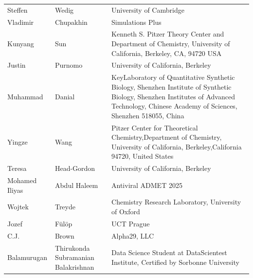 \documentclass{article}
\begin{document}
\begin{table}[]
\begin{tabular}{lll}
\rowcolor[HTML]{FFFFFF} 
{\color[HTML]{434343} Steffen} & {\color[HTML]{434343} Wedig} & {\color[HTML]{434343} University of Cambridge} \\
\rowcolor[HTML]{F8F9FA} 
{\color[HTML]{434343} Vladimir} & {\color[HTML]{434343} Chupakhin} & {\color[HTML]{434343} Simulations Plus} \\
\rowcolor[HTML]{FFFFFF} 
{\color[HTML]{434343} Kunyang} & {\color[HTML]{434343} Sun} & {\color[HTML]{434343} Kenneth S. Pitzer Theory Center and Department of Chemistry, University of California, Berkeley, CA, 94720 USA} \\
\rowcolor[HTML]{F8F9FA} 
{\color[HTML]{434343} Justin} & {\color[HTML]{434343} Purnomo} & {\color[HTML]{434343} University of California, Berkeley} \\
\rowcolor[HTML]{FFFFFF} 
{\color[HTML]{434343} Muhammad} & {\color[HTML]{434343} Danial} & {\color[HTML]{434343} KeyLaboratory of Quantitative Synthetic Biology, Shenzhen Institute of Synthetic Biology, Shenzhen Institutes of Advanced Technology, Chinese Academy of Sciences,  Shenzhen 518055, China} \\
\rowcolor[HTML]{F8F9FA} 
{\color[HTML]{434343} Yingze} & {\color[HTML]{434343} Wang} & {\color[HTML]{434343} Pitzer Center for Theoretical Chemistry,Department of Chemistry, University of California, Berkeley,California 94720, United States} \\
\rowcolor[HTML]{FFFFFF} 
{\color[HTML]{434343} Teresa} & {\color[HTML]{434343} Head-Gordon} & {\color[HTML]{434343} University of California, Berkeley} \\
\rowcolor[HTML]{F8F9FA} 
{\color[HTML]{434343} Mohamed Iliyas} & {\color[HTML]{434343} Abdul Haleem} & {\color[HTML]{434343} Antiviral ADMET 2025} \\
\rowcolor[HTML]{FFFFFF} 
{\color[HTML]{434343} Wojtek} & {\color[HTML]{434343} Treyde} & {\color[HTML]{434343} Chemistry Research Laboratory, University of Oxford} \\
\rowcolor[HTML]{F8F9FA} 
{\color[HTML]{434343} Jozef} & {\color[HTML]{434343} Fülöp} & {\color[HTML]{434343} UCT Prague} \\
\rowcolor[HTML]{FFFFFF} 
{\color[HTML]{434343} C.J.} & {\color[HTML]{434343} Brown} & {\color[HTML]{434343} Alpha29, LLC} \\
\rowcolor[HTML]{F8F9FA} 
{\color[HTML]{434343} Balamurugan} & {\color[HTML]{434343} Thirukonda Subramanian Balakrishnan} & {\color[HTML]{434343} Data Science Student at DataScientest Institute, Certified by Sorbonne University} \\

\end{tabular}
\end{table}
\end{document}
